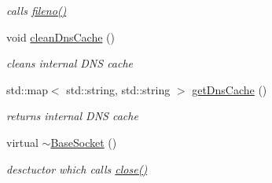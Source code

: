 \begin{CompactItemize}
\begin{CompactList}\small\item\em calls \hyperlink{classsocketpp_1_1BaseSocket_c96db07cc917926d895d89cf73734ea1}{fileno()} \item\end{CompactList}\item 
\hypertarget{classsocketpp_1_1BaseSocket_f3a4c01a7bf911460296a873ce0913da}{
void \hyperlink{classsocketpp_1_1BaseSocket_f3a4c01a7bf911460296a873ce0913da}{cleanDnsCache} ()}
\label{classsocketpp_1_1BaseSocket_f3a4c01a7bf911460296a873ce0913da}

\begin{CompactList}\small\item\em cleans internal DNS cache \item\end{CompactList}\item 
std::map$<$ std::string, std::string $>$ \hyperlink{classsocketpp_1_1BaseSocket_52bf8df48bf4da48eff4adc690caa211}{getDnsCache} ()
\begin{CompactList}\small\item\em returns internal DNS cache \item\end{CompactList}\item 
\hypertarget{classsocketpp_1_1BaseSocket_2e066addfaa6f5648e68b3e6b0a15e79}{
virtual \hyperlink{classsocketpp_1_1BaseSocket_2e066addfaa6f5648e68b3e6b0a15e79}{$\sim$BaseSocket} ()}
\label{classsocketpp_1_1BaseSocket_2e066addfaa6f5648e68b3e6b0a15e79}

\begin{CompactList}\small\item\em desctuctor which calls \hyperlink{classsocketpp_1_1BaseSocket_f067195056bb6b5a65c4bc1d2ac7da72}{close()} \item\end{CompactList}\end{CompactItemize}
